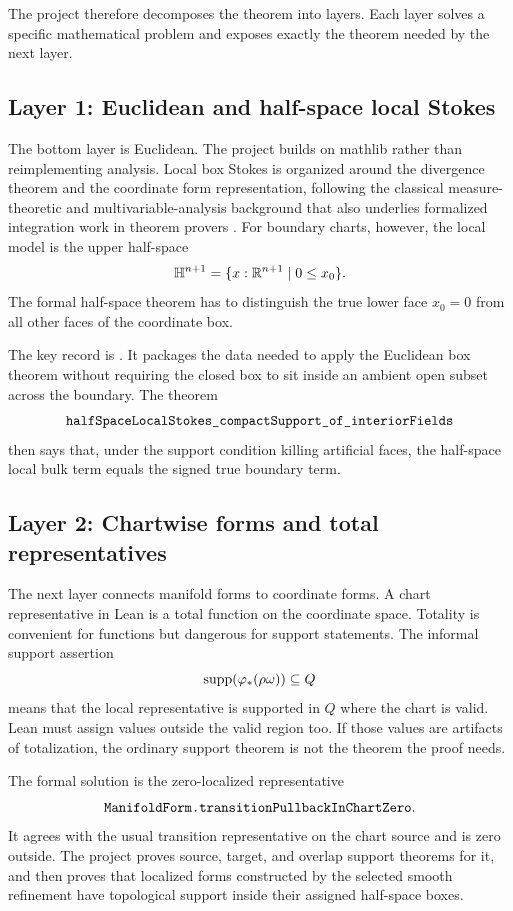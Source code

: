 The project therefore decomposes the theorem into layers.  Each layer solves a
specific mathematical problem and exposes exactly the theorem needed by the
next layer.

\subsection{Layer 1: Euclidean and half-space local Stokes}

The bottom layer is Euclidean.  The project builds on mathlib rather than
reimplementing analysis.  Local box Stokes is organized around the divergence
theorem and the coordinate form representation, following the classical
measure-theoretic and multivariable-analysis background that also underlies
formalized integration work in theorem provers
\cite{rudin1987real,evans1992measure,federer1969geometric,gouezel2022change,vandoorn2021haar}.
For boundary charts, however, the local model is the upper half-space
\[
  \mathbb{H}^{n+1} = \{x : \mathbb{R}^{n+1} \mid 0 \le x_0\}.
\]
The formal half-space theorem has to distinguish the true lower face
\(x_0=0\) from all other faces of the coordinate box.

The key record is .  It packages the
data needed to apply the Euclidean box theorem without requiring the closed
box to sit inside an ambient open subset across the boundary.  The theorem
\[
\code{halfSpaceLocalStokes_compactSupport_of_interiorFields}
\]
then says that, under the support condition killing artificial faces, the
half-space local bulk term equals the signed true boundary term.

\subsection{Layer 2: Chartwise forms and total representatives}

The next layer connects manifold forms to coordinate forms.  A chart
representative in Lean is a total function on the coordinate space.  Totality
is convenient for functions but dangerous for support statements.  The
informal support assertion
\[
  \operatorname{supp}(\varphi_*(\rho\omega)) \subseteq Q
\]
means that the local representative is supported in \(Q\) where the chart is
valid.  Lean must assign values outside the valid region too.  If those values
are artifacts of totalization, the ordinary support theorem is not the theorem
the proof needs.

The formal solution is the zero-localized representative
\[
\code{ManifoldForm.transitionPullbackInChartZero}.
\]
It agrees with the usual transition representative on the chart source and is
zero outside.  The project proves source, target, and overlap support
theorems for it, and then proves that localized forms constructed by the
selected smooth refinement have topological support inside their assigned
half-space boxes.

